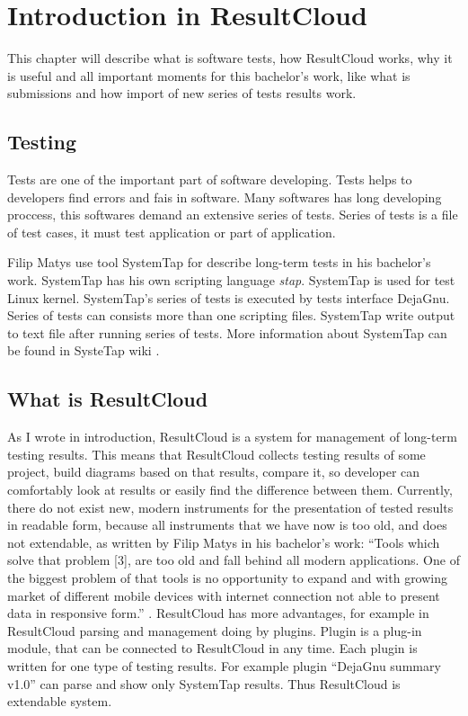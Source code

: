 \chapter{Introduction in ResultCloud}
\label{ch:resultcloud}

This chapter will describe what is software tests, how ResultCloud works, why it is useful and all important moments for this bachelor's work, like what is submissions and how import of new series of tests results work.

\section{Testing}

Tests are one of the important part of software developing. Tests helps to developers find errors and fais in software. Many softwares has long developing proccess, this softwares demand an extensive series of tests. Series of tests is a file of test cases, it must test application or part of application.

Filip Matys use tool SystemTap for describe long-term tests in his bachelor's work. SystemTap has his own scripting language \emph{stap}. SystemTap is used for test Linux kernel. SystemTap's series of tests is executed by tests interface DejaGnu. Series of tests can consists more than one scripting files. SystemTap write output to text file after running series of tests. More information about SystemTap can be found in SysteTap wiki \cite{systemtap}.

\section{What is ResultCloud}

As I wrote in introduction, ResultCloud is a system for management of long-term testing results. This means that ResultCloud collects testing results of some project, build diagrams based on that results, compare it, so developer can comfortably look at results or easily find the difference between them. Currently, there do not exist new, modern instruments for the presentation of tested results in readable form, because all instruments that we have now is too old, and does not extendable, as written by Filip Matys in his bachelor's work: “Tools which solve that problem [3], are too old and fall behind all modern applications. One of the biggest problem of that tools is no opportunity to expand and with growing market of different mobile devices with internet connection not able to present data in responsive form.” \cite{filip}. ResultCloud has more advantages, for example in ResultCloud parsing and management doing by plugins. Plugin is a plug-in module, that can be connected to ResultCloud in any time. Each plugin is written for one type of testing results. For example plugin “DejaGnu summary v1.0” can parse and show only SystemTap results. Thus ResultCloud is extendable system.

